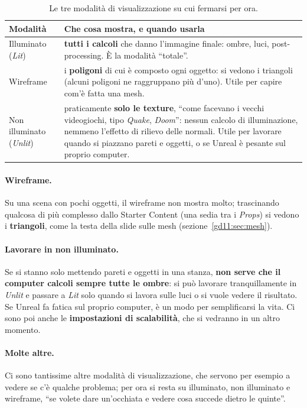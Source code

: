 \begin{table}[htbp]
\centering
\small
\begin{tabular}{@{}p{3.6cm}p{9.0cm}@{}}
\toprule
\textbf{Modalità} & \textbf{Che cosa mostra, e quando usarla} \\
\midrule
Illuminato (\emph{Lit}) & \textbf{tutti i calcoli} che danno l'immagine finale:
  ombre, luci, post-processing. È la modalità ``totale''. \\
\addlinespace
Wireframe & i \textbf{poligoni} di cui è composto ogni oggetto: si vedono i
  triangoli (alcuni poligoni ne raggruppano più d'uno). Utile per capire com'è
  fatta una mesh. \\
\addlinespace
Non illuminato (\emph{Unlit}) & praticamente \textbf{solo le texture}, ``come
  facevano i vecchi videogiochi, tipo \emph{Quake}, \emph{Doom}'': nessun calcolo
  di illuminazione, nemmeno l'effetto di rilievo delle normali. Utile per
  lavorare quando si piazzano pareti e oggetti, o se Unreal è pesante sul
  proprio computer. \\
\bottomrule
\end{tabular}
\caption{Le tre modalità di visualizzazione su cui fermarsi per ora.}
\label{gd11:tab:view}
\end{table}

\paragraph{Wireframe.} Su una scena con pochi oggetti, il wireframe non mostra
molto; trascinando qualcosa di più complesso dallo Starter Content (una sedia
tra i \emph{Props}) si vedono i \textbf{triangoli}, come la testa della slide
sulle mesh (sezione~\ref{gd11:sec:mesh}).

\paragraph{Lavorare in non illuminato.} Se si stanno solo mettendo pareti e
oggetti in una stanza, \textbf{non serve che il computer calcoli sempre tutte le
ombre}: si può lavorare tranquillamente in \emph{Unlit} e passare a \emph{Lit}
solo quando si lavora sulle luci o si vuole vedere il risultato. Se Unreal fa
fatica sul proprio computer, è un modo per semplificarsi la vita. Ci sono poi
anche le \textbf{impostazioni di scalabilità}, che si vedranno in un altro
momento.

\paragraph{Molte altre.} Ci sono tantissime altre modalità di visualizzazione,
che servono per esempio a vedere se c'è qualche problema; per ora si resta su
illuminato, non illuminato e wireframe, ``se volete dare un'occhiata e vedere
cosa succede dietro le quinte''.

